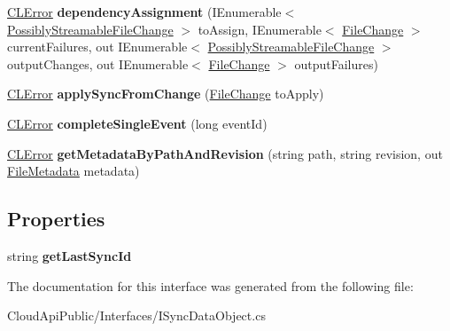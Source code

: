 \begin{DoxyCompactItemize}
\item 
\hypertarget{interface_cloud_api_public_1_1_interfaces_1_1_i_sync_data_object_a2b36076284fea39198c49ac28decae44}{\hyperlink{class_cloud_api_public_1_1_model_1_1_c_l_error}{C\-L\-Error} {\bfseries dependency\-Assignment} (I\-Enumerable$<$ \hyperlink{struct_cloud_api_public_1_1_model_1_1_possibly_streamable_file_change}{Possibly\-Streamable\-File\-Change} $>$ to\-Assign, I\-Enumerable$<$ \hyperlink{class_cloud_api_public_1_1_model_1_1_file_change}{File\-Change} $>$ current\-Failures, out I\-Enumerable$<$ \hyperlink{struct_cloud_api_public_1_1_model_1_1_possibly_streamable_file_change}{Possibly\-Streamable\-File\-Change} $>$ output\-Changes, out I\-Enumerable$<$ \hyperlink{class_cloud_api_public_1_1_model_1_1_file_change}{File\-Change} $>$ output\-Failures)}\label{interface_cloud_api_public_1_1_interfaces_1_1_i_sync_data_object_a2b36076284fea39198c49ac28decae44}

\item 
\hypertarget{interface_cloud_api_public_1_1_interfaces_1_1_i_sync_data_object_a2508ef227c6b6a7e0222a575df30f53c}{\hyperlink{class_cloud_api_public_1_1_model_1_1_c_l_error}{C\-L\-Error} {\bfseries apply\-Sync\-From\-Change} (\hyperlink{class_cloud_api_public_1_1_model_1_1_file_change}{File\-Change} to\-Apply)}\label{interface_cloud_api_public_1_1_interfaces_1_1_i_sync_data_object_a2508ef227c6b6a7e0222a575df30f53c}

\item 
\hypertarget{interface_cloud_api_public_1_1_interfaces_1_1_i_sync_data_object_aeda55123f350e80434eb202601316828}{\hyperlink{class_cloud_api_public_1_1_model_1_1_c_l_error}{C\-L\-Error} {\bfseries complete\-Single\-Event} (long event\-Id)}\label{interface_cloud_api_public_1_1_interfaces_1_1_i_sync_data_object_aeda55123f350e80434eb202601316828}

\item 
\hypertarget{interface_cloud_api_public_1_1_interfaces_1_1_i_sync_data_object_ac9ff5ecaa81c07f9e19785db2c4d2368}{\hyperlink{class_cloud_api_public_1_1_model_1_1_c_l_error}{C\-L\-Error} {\bfseries get\-Metadata\-By\-Path\-And\-Revision} (string path, string revision, out \hyperlink{class_cloud_api_public_1_1_model_1_1_file_metadata}{File\-Metadata} metadata)}\label{interface_cloud_api_public_1_1_interfaces_1_1_i_sync_data_object_ac9ff5ecaa81c07f9e19785db2c4d2368}

\end{DoxyCompactItemize}
\subsection*{Properties}
\begin{DoxyCompactItemize}
\item 
\hypertarget{interface_cloud_api_public_1_1_interfaces_1_1_i_sync_data_object_a1e0e4f15f93fce38eb008953eb1dd477}{string {\bfseries get\-Last\-Sync\-Id}}\label{interface_cloud_api_public_1_1_interfaces_1_1_i_sync_data_object_a1e0e4f15f93fce38eb008953eb1dd477}

\end{DoxyCompactItemize}


The documentation for this interface was generated from the following file\-:\begin{DoxyCompactItemize}
\item 
Cloud\-Api\-Public/\-Interfaces/I\-Sync\-Data\-Object.\-cs\end{DoxyCompactItemize}
